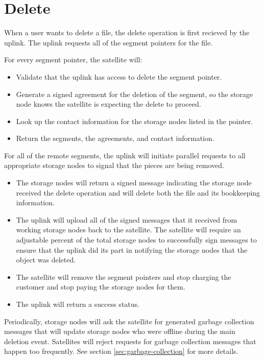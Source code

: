 \documentclass[11pt,fleqn,openany]{book}
\begin{document}
\section{Delete}

When a user wants to delete a file, the delete operation is first recieved
by the uplink. The uplink requests all of the segment pointers for the file.

For every segment pointer, the satellite will:
  \begin{itemize}
  \item Validate that the uplink has access to delete the segment pointer.
  \item Generate a signed agreement for the deletion of the segment, so the
    storage node knows the satellite is expecting the delete to proceed.
  \item Look up the contact information for the storage nodes listed in the
  pointer.
  \item Return the segments, the agreements, and contact information.
  \end{itemize}

For all of the remote segments, the uplink will
  initiate parallel requests to all appropriate storage nodes to signal that the
  pieces are being removed.

\begin{itemize}
\item The storage nodes will return a signed message indicating the storage node
received the
delete operation and will delete both the file and its bookkeeping information.
\item The uplink will upload all of the signed messages that it received from
  working storage nodes back to the satellite. The satellite will require an
  adjustable percent of the total storage nodes to successfully sign messages
  to ensure that the uplink did its part in notifying the storage nodes that the
  object was deleted.
\item The satellite will remove the segment pointers and stop charging the
  customer and stop paying the storage nodes for them.
\item The uplink will return a success status.
\end{itemize}

Periodically, storage nodes will ask the satellite for generated garbage
  collection messages that will update storage nodes who were offline during the
  main deletion event.
  Satellites will reject requests for garbage collection messages that
  happen too frequently. See section \ref{sec:garbage-collection} for more
  details.
\end{document}
